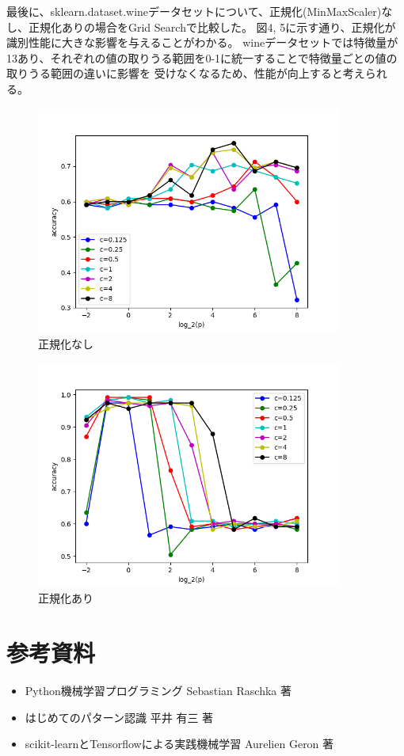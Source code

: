 \documentclass{jsarticle}
\begin{document}
最後に、sklearn.dataset.wineデータセットについて、正規化(MinMaxScaler)なし、正規化ありの場合をGrid Searchで比較した。
図4, 5に示す通り、正規化が識別性能に大きな影響を与えることがわかる。
wineデータセットでは特徴量が13あり、それぞれの値の取りうる範囲を0-1に統一することで特徴量ごとの値の取りうる範囲の違いに影響を
受けなくなるため、性能が向上すると考えられる。
\begin{figure}[!h]
\centering \includegraphics[width=10cm]{nostd.png}
\caption{正規化なし}
\end{figure}
\begin{figure}[!h]
\centering \includegraphics[width=10cm]{std.png}
\caption{正規化あり}
\end{figure}


\section{参考資料}
\begin{itemize}
    \item Python機械学習プログラミング Sebastian Raschka 著
    \item はじめてのパターン認識 平井 有三 著
    \item scikit-learnとTensorflowによる実践機械学習 Aurelien Geron 著
\end{itemize}
\end{document}
